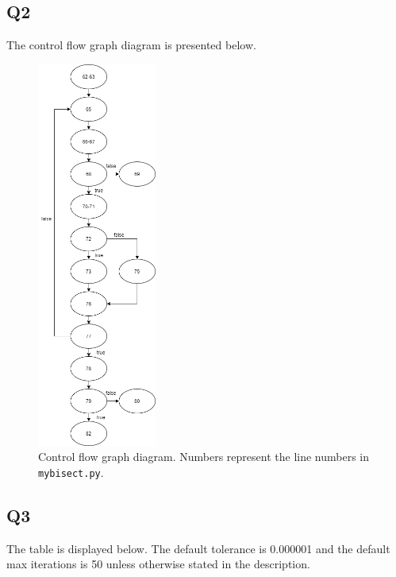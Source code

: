 \documentclass[12pt, letterpaper, titlepage]{article}
\begin{document}
\subsection*{Q2}
The control flow graph diagram is presented below.
\begin{figure}[H]
    \centering
    \caption{Control flow graph diagram. Numbers represent the line numbers in \lstinline{mybisect.py}.}
    \includegraphics[width=0.35\textwidth]{ControlDiagram.png}
\end{figure}

\subsection*{Q3}
The table is displayed below. The default tolerance is 0.000001 and the default max iterations is 50 unless otherwise stated in the description.
\end{document}

